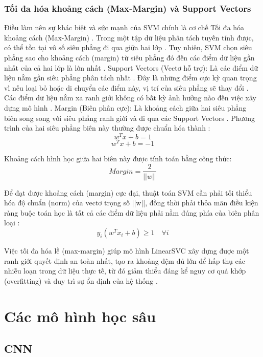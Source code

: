 \subsubsection{Tối đa hóa khoảng cách (Max-Margin) và Support Vectors}

Điều làm nên sự khác biệt và sức mạnh của SVM chính là cơ chế Tối đa hóa khoảng cách (Max-Margin) \cite{hastie2009elements}. Trong một tập dữ liệu phân tách tuyến tính được, có thể tồn tại vô số siêu phẳng đi qua giữa hai lớp \cite{hastie2009elements}. Tuy nhiên, SVM chọn siêu phẳng sao cho khoảng cách (margin) từ siêu phẳng đó đến các điểm dữ liệu gần nhất của cả hai lớp là lớn nhất \cite{hastie2009elements}. Support Vectors (Vectơ hỗ trợ): Là các điểm dữ liệu nằm gần siêu phẳng phân tách nhất \cite{hastie2009elements}. Đây là những điểm cực kỳ quan trọng vì nếu loại bỏ hoặc di chuyển các điểm này, vị trí của siêu phẳng sẽ thay đổi \cite{hastie2009elements}. Các điểm dữ liệu nằm xa ranh giới không có bất kỳ ảnh hưởng nào đến việc xây dựng mô hình \cite{hastie2009elements}. Margin (Biên phân cực): Là khoảng cách giữa hai siêu phẳng biên song song với siêu phẳng ranh giới và đi qua các Support Vectors \cite{hastie2009elements}. Phương trình của hai siêu phẳng biên này thường được chuẩn hóa thành \cite{hastie2009elements}:
$$ w^T x + b = 1 $$
$$ w^T x + b = -1 $$

Khoảng cách hình học giữa hai biên này được tính toán bằng công thức:
$$
Margin = \frac{2}{||w||}
$$

Để đạt được khoảng cách (margin) cực đại, thuật toán SVM cần phải tối thiểu hóa độ chuẩn (norm) của vectơ trọng số ||w||, đồng thời phải thỏa mãn điều kiện ràng buộc toán học là tất cả các điểm dữ liệu phải nằm đúng phía của biên phân loại \cite{hastie2009elements}:
$$
y_i (w^T x_i + b) \ge 1 \quad \forall i
$$

Việc tối đa hóa lề (max-margin) giúp mô hình LinearSVC xây dựng được một ranh giới quyết định an toàn nhất, tạo ra khoảng đệm đủ lớn để hấp thụ các nhiễu loạn trong dữ liệu thực tế, từ đó giảm thiểu đáng kể nguy cơ quá khớp (overfitting) và duy trì sự ổn định của hệ thống \cite{hastie2009elements}.

\section{Các mô hình học sâu}

\subsection{CNN}

